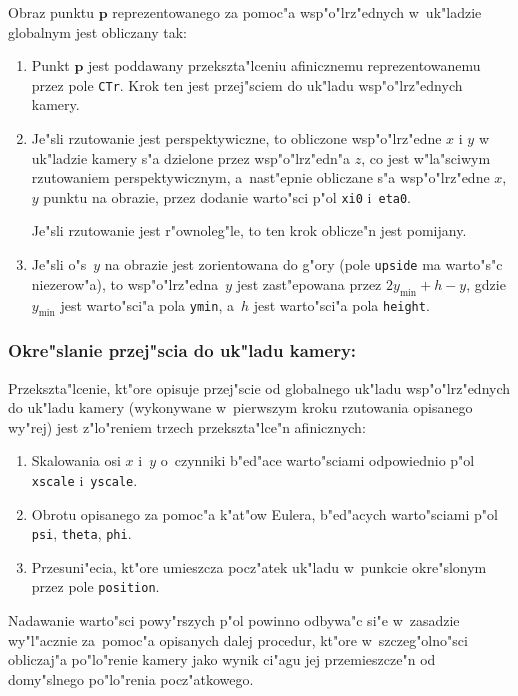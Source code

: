 Obraz punktu $\bm{p}$ reprezentowanego za pomoc"a wsp"o"lrz"ednych
w~uk"ladzie globalnym jest obliczany tak:
\begin{enumerate}
  \item\begin{sloppypar}
    Punkt $\bm{p}$ jest poddawany przekszta"lceniu afinicznemu
    reprezentowanemu przez pole \texttt{CTr}. Krok ten jest przej"sciem do
    uk"ladu wsp"o"lrz"ednych kamery.%
    \end{sloppypar}
  \item Je"sli rzutowanie jest perspektywiczne, to obliczone wsp"o"lrz"edne
    $x$ i $y$ w uk"ladzie kamery s"a dzielone przez wsp"o"lrz"edn"a $z$, co
    jest w"la"sciwym rzutowaniem perspektywicznym, a~nast"epnie obliczane
    s"a wsp"o"lrz"edne $x$, $y$ punktu na obrazie, przez dodanie
    warto"sci p"ol \texttt{xi0} i~\texttt{eta0}.

    Je"sli rzutowanie jest r"ownoleg"le, to ten krok oblicze"n jest pomijany.
  \item Je"sli o"s~$y$ na obrazie jest zorientowana do g"ory (pole
   \texttt{upside} ma warto"s"c niezerow"a), to wsp"o"lrz"edna~$y$
   jest zast"epowana przez $2y_{\mathrm{min}}+h-y$, gdzie $y_{\mathrm{min}}$
   jest warto"sci"a pola \texttt{ymin}, a~$h$ jest warto"sci"a pola
   \texttt{height}.
\end{enumerate}


\subsubsection*{Okre"slanie przej"scia do uk"ladu kamery:}

Przekszta"lcenie, kt"ore opisuje przej"scie od globalnego uk"ladu
wsp"o"lrz"ednych do uk"ladu kamery (wykonywane w~pierwszym kroku rzutowania
opisanego wy"rej) jest z"lo"reniem trzech przekszta"lce"n afinicznych:
\begin{enumerate}
  \item Skalowania osi $x$ i~$y$ o~czynniki b"ed"ace warto"sciami
    odpowiednio p"ol \texttt{xscale} i~\texttt{yscale}.
  \item Obrotu opisanego za pomoc"a k"at"ow Eulera, b"ed"acych warto"sciami
    p"ol \texttt{psi}, \texttt{theta}, \texttt{phi}.
  \item Przesuni"ecia, kt"ore umieszcza pocz"atek uk"ladu w~punkcie
    okre"slonym przez pole \texttt{position}.
\end{enumerate}
Nadawanie warto"sci powy"rszych p"ol powinno odbywa"c si"e w~zasadzie
wy"l"acznie za~pomoc"a opisanych dalej procedur, kt"ore w~szczeg"olno"sci
obliczaj"a po"lo"renie kamery jako wynik ci"agu jej przemieszcze"n od
domy"slnego po"lo"renia pocz"atkowego.


